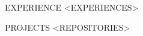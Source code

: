 \documentclass{resume} %
\begin{document}






\begin{rSection}{EXPERIENCE}
    <EXPERIENCES>
\end{rSection}



\begin{rSection}{PROJECTS}
    <REPOSITORIES>
\end{rSection}









\end{document}
